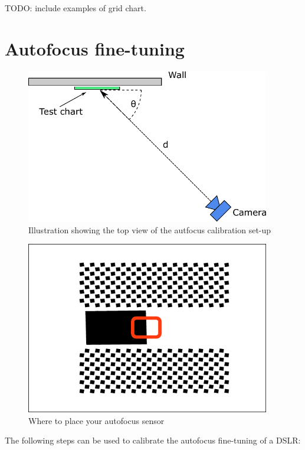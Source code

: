 \documentclass[a4paper]{article}
\begin{document}
TODO: include examples of grid chart.


\section{Autofocus fine-tuning}
\label{sec:autofocus}
%
\begin{figure}
\centering
\includegraphics[width=0.95\textwidth]{figures/af_setup}
\caption{Illustration showing the top view of the autfocus calibration
set-up}
\label{fig:af_setup}
\end{figure}
%
\begin{figure}
\centering
\includegraphics[width=0.95\textwidth]{figures/af_sensor_placement}
\caption{Where to place your autofocus sensor}
\label{fig:af_sensor_placement}
\end{figure}
%
The following steps can be used to calibrate the autofocus fine-tuning of a
DSLR:
\end{document}
